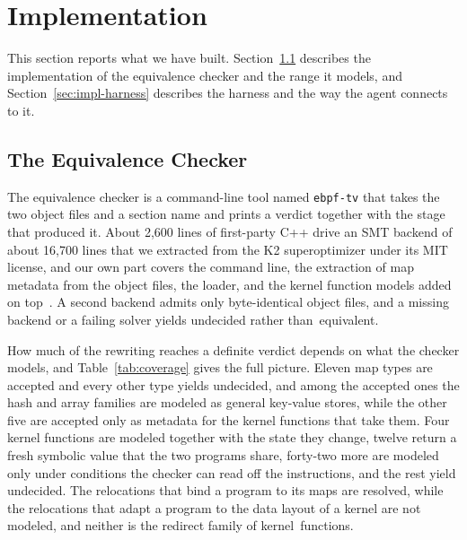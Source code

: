 \section{Implementation}\label{sec:impl}

This section reports what we have built.
Section~\ref{sec:impl-checker} describes the implementation of the equivalence checker and the range it models, and Section~\ref{sec:impl-harness} describes the harness and the way the agent connects to it.

\subsection{The Equivalence Checker}\label{sec:impl-checker}

The equivalence checker is a command-line tool named \texttt{ebpf-tv} that takes the two object files and a section name and prints a verdict together with the stage that produced it.
About 2,600 lines of first-party C++ drive an SMT backend of about 16,700 lines that we extracted from the K2 superoptimizer under its MIT license, and our own part covers the command line, the extraction of map metadata from the object files, the loader, and the kernel function models added on top~\cite{xu2021synthesizing}.
A second backend admits only byte-identical object files, and a missing backend or a failing solver yields undecided rather than~equivalent.

How much of the rewriting reaches a definite verdict depends on what the checker models, and Table~\ref{tab:coverage} gives the full picture.
Eleven map types are accepted and every other type yields undecided, and among the accepted ones the hash and array families are modeled as general key-value stores, while the other five are accepted only as metadata for the kernel functions that take them.
Four kernel functions are modeled together with the state they change, twelve return a fresh symbolic value that the two programs share, forty-two more are modeled only under conditions the checker can read off the instructions, and the rest yield undecided.
The relocations that bind a program to its maps are resolved, while the relocations that adapt a program to the data layout of a kernel are not modeled, and neither is the redirect family of kernel~functions.

